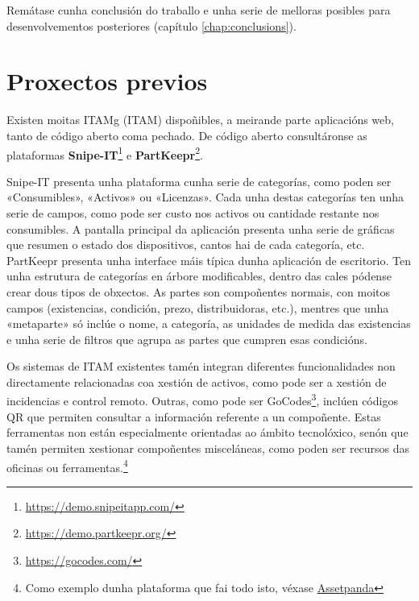 Remátase cunha conclusión do traballo e unha serie de melloras posibles para desenvolvementos posteriores (capítulo \ref{chap:conclusions}).

\section{Proxectos previos}

Existen moitas \Gls{ITAMg} (\acrlong{ITAM}) dispoñibles, a meirande parte aplicacións web, tanto de código aberto coma pechado. De código aberto consultáronse as plataformas \textbf{Snipe-IT}\footnote{\url{https://demo.snipeitapp.com/}} e \textbf{PartKeepr}\footnote{\url{https://demo.partkeepr.org/}}.
 
Snipe-IT presenta unha plataforma cunha serie de categorías, como poden ser «Consumibles», «Activos» ou «Licenzas». Cada unha destas categorías ten unha serie de campos, como pode ser custo nos activos ou cantidade restante nos consumibles. A pantalla principal da aplicación presenta unha serie de gráficas que resumen o estado dos dispositivos, cantos hai de cada categoría, etc. PartKeepr presenta unha interface máis típica dunha aplicación de escritorio. Ten unha estrutura de categorías en árbore modificables, dentro das cales pódense crear dous tipos de obxectos. As partes son compoñentes normais, con moitos campos (existencias, condición, prezo, distribuidoras, etc.), mentres que unha «metaparte» só inclúe o nome, a categoría, as unidades de medida das existencias e unha serie de filtros que agrupa as partes que cumpren esas condicións.

Os sistemas de ITAM existentes tamén integran diferentes funcionalidades non directamente relacionadas coa xestión de activos\cite{forbes}, como pode ser a xestión de incidencias e control remoto. Outras, como pode ser GoCodes\footnote{\url{https://gocodes.com/}}, inclúen códigos QR que permiten consultar a información referente a un compoñente. Estas ferramentas non están especialmente orientadas ao ámbito tecnolóxico, senón que tamén permiten xestionar compoñentes misceláneas, como poden ser recursos das oficinas ou ferramentas.\footnote{Como exemplo dunha plataforma que fai todo isto, véxase \href{https://www.assetpanda.com/solutions/education/}{Assetpanda}}